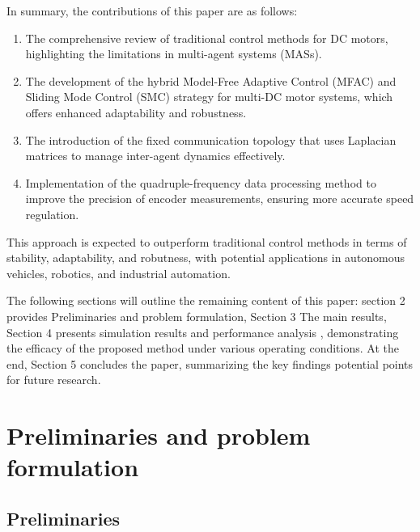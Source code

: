 \documentclass[journal,onecolumn]{IEEEtran}
\begin{document}
In summary, the contributions of this paper are as follows:
\begin{enumerate}
    \item The comprehensive review of traditional control methods for DC motors, highlighting the limitations in multi-agent systems (MASs).
    
    \item The development of the hybrid Model-Free Adaptive Control (MFAC) and Sliding Mode Control (SMC) strategy for multi-DC motor systems, which offers enhanced adaptability and robustness.
    
    \item The introduction of the fixed communication topology that uses Laplacian matrices to manage inter-agent dynamics effectively.
    
    \item Implementation of the quadruple-frequency data processing method to improve the precision of encoder measurements, ensuring more accurate speed regulation.
\end{enumerate}

This approach is expected to outperform traditional control methods in terms of stability, adaptability, and robutness, with potential applications in autonomous vehicles, robotics, and industrial automation.




    The following sections will outline the remaining content of this paper:
    section 2 provides Preliminaries and problem formulation, Section 3 The main results, Section 4 presents simulation results and performance analysis , demonstrating the efficacy of the proposed method under various operating conditions.
    At the end, Section 5 concludes the paper, summarizing the key findings potential points for future research.


\section{Preliminaries and problem formulation}\label{section:2}
\subsection{Preliminaries}
\end{document}
